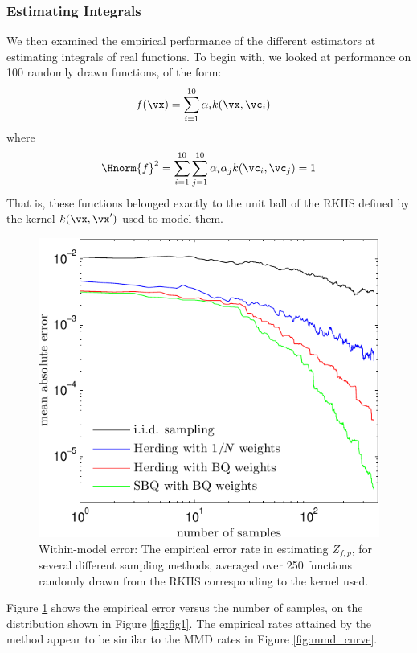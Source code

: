\subsubsection{Estimating Integrals}


We then examined the empirical performance of the different estimators at estimating integrals of real functions.  To begin with, we looked at performance on 100 randomly drawn functions, of the form:
%
\begin{align}
f(\vx) & = \sum_{i=1}^{10} \alpha_i k(\vx, \vc_i)
\end{align}
%
where
\begin{align}
\Hnorm{f}^2 = \sum_{i=1}^{10} \sum_{j=1}^{10} \alpha_i \alpha_j k(\vc_i, \vc_j) = 1
\end{align}
%
That is, these functions belonged exactly to the unit ball of the RKHS defined by the kernel $k(\vx, \vx')$ used to model them.
%
\begin{figure}
\includegraphics[width=\columnwidth]{figs/herding/error_curve_rkhs_400_v4}
\caption{Within-model error: The empirical error rate in estimating $Z_{f,p}$, for several different sampling methods, averaged over 250 functions randomly drawn from the RKHS corresponding to the kernel used.}
\label{fig:error_curve}
\end{figure}
%
Figure \ref{fig:error_curve} shows the empirical error versus the number of samples, on the distribution shown in Figure \ref{fig:fig1}.  The empirical rates attained by the method appear to be similar to the MMD rates in Figure \ref{fig:mmd_curve}.


